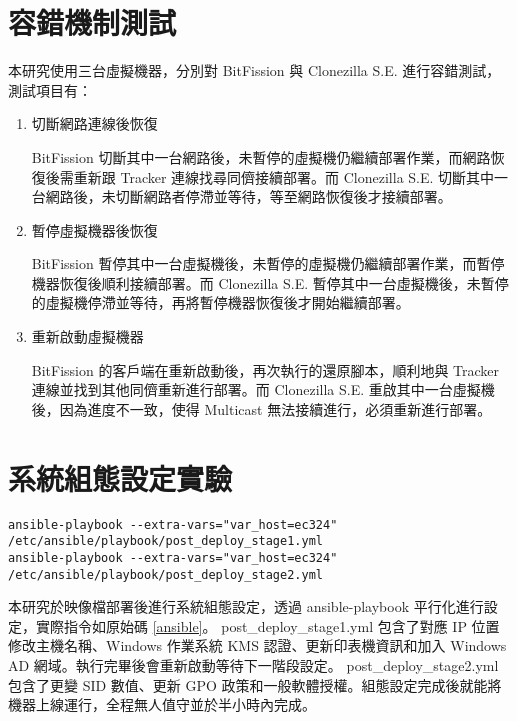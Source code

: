 \section{容錯機制測試}
\label{faulttolerant}
本研究使用三台虛擬機器，分別對 BitFission 與 Clonezilla S.E. 進行容錯測試，測試項目有：
\begin{enumerate}
\item 切斷網路連線後恢復

BitFission 切斷其中一台網路後，未暫停的虛擬機仍繼續部署作業，而網路恢復後需重新跟 Tracker 連線找尋同儕接續部署。而 Clonezilla S.E. 切斷其中一台網路後，未切斷網路者停滯並等待，等至網路恢復後才接續部署。
\item 暫停虛擬機器後恢復

BitFission 暫停其中一台虛擬機後，未暫停的虛擬機仍繼續部署作業，而暫停機器恢復後順利接續部署。而 Clonezilla S.E. 暫停其中一台虛擬機後，未暫停的虛擬機停滯並等待，再將暫停機器恢復後才開始繼續部署。
\item 重新啟動虛擬機器

BitFission 的客戶端在重新啟動後，再次執行的還原腳本，順利地與 Tracker 連線並找到其他同儕重新進行部署。而 Clonezilla S.E. 重啟其中一台虛擬機後，因為進度不一致，使得 Multicast 無法接續進行，必須重新進行部署。
\end{enumerate}
\section{系統組態設定實驗}
\begin{lstlisting}[label={ansible},caption= Shell commands of ansible-playbook]
ansible-playbook --extra-vars="var_host=ec324" /etc/ansible/playbook/post_deploy_stage1.yml 
ansible-playbook --extra-vars="var_host=ec324" /etc/ansible/playbook/post_deploy_stage2.yml
\end{lstlisting}
本研究於映像檔部署後進行系統組態設定，透過 ansible-playbook 平行化進行設定，實際指令如原始碼 \ref{ansible}。
post\_deploy\_stage1.yml 包含了對應 IP 位置修改主機名稱、Windows 作業系統 KMS 認證、更新印表機資訊和加入 Windows AD 網域。執行完畢後會重新啟動等待下一階段設定。
post\_deploy\_stage2.yml 包含了更變 SID 數值、更新 GPO 政策和一般軟體授權。組態設定完成後就能將機器上線運行，全程無人值守並於半小時內完成。
